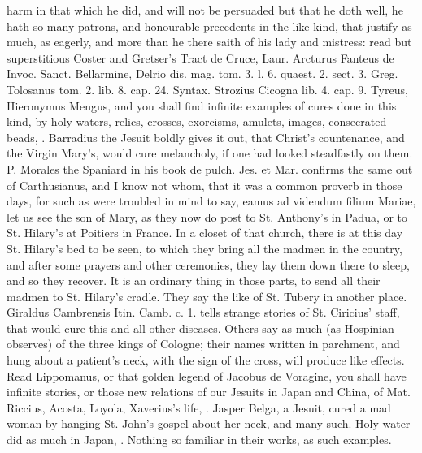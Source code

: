{harm in that which he did, and will not be persuaded but that he doth
well, he hath so many patrons, and honourable precedents in the like
kind, that justify as much, as eagerly, and more than he there saith of
his lady and mistress: read but superstitious Coster and Gretser's
Tract de Cruce, Laur. Arcturus Fanteus de Invoc. Sanct. Bellarmine,
Delrio dis. mag. tom. 3. l. 6. quaest. 2. sect. 3. Greg. Tolosanus tom.
2. lib. 8. cap. 24. Syntax. Strozius Cicogna lib. 4. cap. 9. Tyreus,
Hieronymus Mengus, and you shall find infinite examples of cures done
in this kind, by holy waters, relics, crosses, exorcisms, amulets,
images, consecrated beads, \etc{}. Barradius the Jesuit boldly gives it
out, that Christ's countenance, and the Virgin Mary's, would cure
melancholy, if one had looked steadfastly on them. P. Morales the
Spaniard in his book de pulch. Jes. et Mar. confirms the same out of
Carthusianus, and I know not whom, that it was a common proverb in
those days, for such as were troubled in mind to say, eamus ad videndum
filium Mariae, let us see the son of Mary, as they now do post to St.
Anthony's in Padua, or to St. Hilary's at Poitiers in France.  In
a closet of that church, there is at this day St. Hilary's bed to be
seen, to which they bring all the madmen in the country, and after some
prayers and other ceremonies, they lay them down there to sleep, and so
they recover. It is an ordinary thing in those parts, to send all their
madmen to St. Hilary's cradle. They say the like of St. Tubery in
 another place. Giraldus Cambrensis Itin. Camb. c. 1. tells
strange stories of St. Ciricius' staff, that would cure this and all
other diseases. Others say as much (as Hospinian observes) of the
three kings of Cologne; their names written in parchment, and hung
about a patient's neck, with the sign of the cross, will produce like
effects. Read Lippomanus, or that golden legend of Jacobus de Voragine,
you shall have infinite stories, or those new relations of our
Jesuits in Japan and China, of Mat. Riccius, Acosta, Loyola,
Xaverius's life, \etc{}. Jasper Belga, a Jesuit, cured a mad woman by
hanging St. John's gospel about her neck, and many such. Holy water did
as much in Japan, \etc{}. Nothing so familiar in their works, as such
examples.

}
